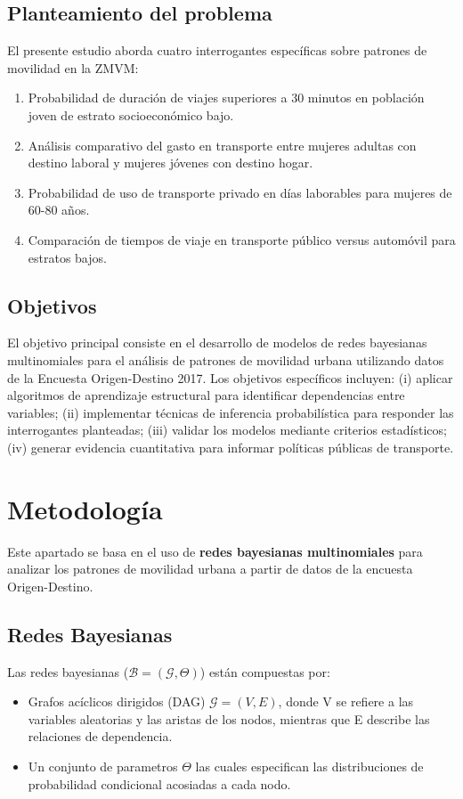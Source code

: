 \documentclass{ajceam-class}   %
\begin{document}
\subsection{Planteamiento del problema}
El presente estudio aborda cuatro interrogantes específicas sobre patrones de movilidad en la ZMVM:
\begin{enumerate}
    \item Probabilidad de duración de viajes superiores a 30 minutos en población joven de estrato socioeconómico bajo.
    \item Análisis comparativo del gasto en transporte entre mujeres adultas con destino laboral y mujeres jóvenes con destino hogar.
    \item Probabilidad de uso de transporte privado en días laborables para mujeres de 60-80 años.
    \item Comparación de tiempos de viaje en transporte público versus automóvil para estratos bajos.
\end{enumerate}

\subsection{Objetivos}
El objetivo principal consiste en el desarrollo de modelos de redes bayesianas multinomiales para el análisis de patrones de movilidad urbana utilizando datos de la Encuesta Origen-Destino 2017. Los objetivos específicos incluyen: (i) aplicar algoritmos de aprendizaje estructural para identificar dependencias entre variables; (ii) implementar técnicas de inferencia probabilística para responder las interrogantes planteadas; (iii) validar los modelos mediante criterios estadísticos; (iv) generar evidencia cuantitativa para informar políticas públicas de transporte.

\section{Metodología}

Este apartado se basa en el uso de \textbf{redes bayesianas multinomiales} para analizar los patrones de movilidad urbana a partir de datos de la encuesta Origen-Destino.

\subsection{Redes Bayesianas}
Las redes bayesianas ($\mathcal{B} = (\mathcal{G}, \Theta)$) están compuestas por: 
\begin{itemize}
    \item Grafos acíclicos dirigidos (DAG) $\mathcal{G} = (V, E)$, donde V se refiere a las variables aleatorias y las aristas de los nodos, mientras que E describe las relaciones de dependencia.
    \item Un conjunto de parametros $\Theta$ las cuales especifican las distribuciones de probabilidad condicional acosiadas a cada nodo.
\end{itemize}
\end{document}
